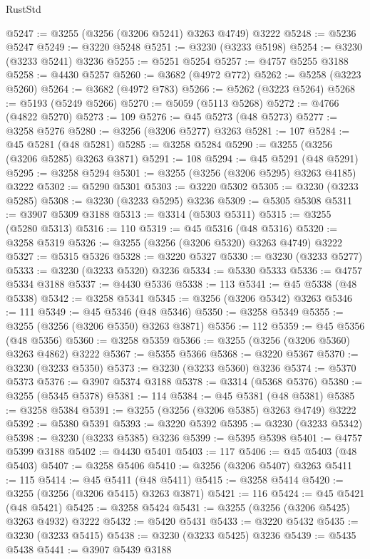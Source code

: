 \begin{lexlean}{RustStd}
\begin{coremodule}
@5247 := @3255 (@3256 (@3206 @5241) @3263 @4749) @3222
@5248 := @5236 @5247
@5249 := @3220 @5248
@5251 := @3230 (@3233 @5198)
@5254 := @3230 (@3233 @5241) @3236
@5255 := @5251 @5254
@5257 := @4757 @5255 @3188
@5258 := @4430 @5257
@5260 := @3682 (@4972 @772)
@5262 := @5258 (@3223 @5260)
@5264 := @3682 (@4972 @783)
@5266 := @5262 (@3223 @5264)
@5268 := @5193 (@5249 @5266)
@5270 := @5059 (@5113 @5268)
@5272 := @4766 (@4822 @5270)
@5273 := 109
@5276 := @45 @5273 (@48 @5273)
@5277 := @3258 @5276
@5280 := @3256 (@3206 @5277) @3263
@5281 := 107
@5284 := @45 @5281 (@48 @5281)
@5285 := @3258 @5284
@5290 := @3255 (@3256 (@3206 @5285) @3263 @3871)
@5291 := 108
@5294 := @45 @5291 (@48 @5291)
@5295 := @3258 @5294
@5301 := @3255 (@3256 (@3206 @5295) @3263 @4185) @3222
@5302 := @5290 @5301
@5303 := @3220 @5302
@5305 := @3230 (@3233 @5285)
@5308 := @3230 (@3233 @5295) @3236
@5309 := @5305 @5308
@5311 := @3907 @5309 @3188
@5313 := @3314 (@5303 @5311)
@5315 := @3255 (@5280 @5313)
@5316 := 110
@5319 := @45 @5316 (@48 @5316)
@5320 := @3258 @5319
@5326 := @3255 (@3256 (@3206 @5320) @3263 @4749) @3222
@5327 := @5315 @5326
@5328 := @3220 @5327
@5330 := @3230 (@3233 @5277)
@5333 := @3230 (@3233 @5320) @3236
@5334 := @5330 @5333
@5336 := @4757 @5334 @3188
@5337 := @4430 @5336
@5338 := 113
@5341 := @45 @5338 (@48 @5338)
@5342 := @3258 @5341
@5345 := @3256 (@3206 @5342) @3263
@5346 := 111
@5349 := @45 @5346 (@48 @5346)
@5350 := @3258 @5349
@5355 := @3255 (@3256 (@3206 @5350) @3263 @3871)
@5356 := 112
@5359 := @45 @5356 (@48 @5356)
@5360 := @3258 @5359
@5366 := @3255 (@3256 (@3206 @5360) @3263 @4862) @3222
@5367 := @5355 @5366
@5368 := @3220 @5367
@5370 := @3230 (@3233 @5350)
@5373 := @3230 (@3233 @5360) @3236
@5374 := @5370 @5373
@5376 := @3907 @5374 @3188
@5378 := @3314 (@5368 @5376)
@5380 := @3255 (@5345 @5378)
@5381 := 114
@5384 := @45 @5381 (@48 @5381)
@5385 := @3258 @5384
@5391 := @3255 (@3256 (@3206 @5385) @3263 @4749) @3222
@5392 := @5380 @5391
@5393 := @3220 @5392
@5395 := @3230 (@3233 @5342)
@5398 := @3230 (@3233 @5385) @3236
@5399 := @5395 @5398
@5401 := @4757 @5399 @3188
@5402 := @4430 @5401
@5403 := 117
@5406 := @45 @5403 (@48 @5403)
@5407 := @3258 @5406
@5410 := @3256 (@3206 @5407) @3263
@5411 := 115
@5414 := @45 @5411 (@48 @5411)
@5415 := @3258 @5414
@5420 := @3255 (@3256 (@3206 @5415) @3263 @3871)
@5421 := 116
@5424 := @45 @5421 (@48 @5421)
@5425 := @3258 @5424
@5431 := @3255 (@3256 (@3206 @5425) @3263 @4932) @3222
@5432 := @5420 @5431
@5433 := @3220 @5432
@5435 := @3230 (@3233 @5415)
@5438 := @3230 (@3233 @5425) @3236
@5439 := @5435 @5438
@5441 := @3907 @5439 @3188

\end{coremodule}
\end{lexlean}
